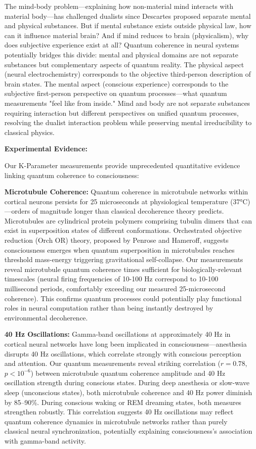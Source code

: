 \documentclass[11pt,a4paper,twoside]{article}
\begin{document}
The mind-body problem---explaining how non-material mind interacts with material body---has challenged dualists since Descartes proposed separate mental and physical substances. But if mental substance exists outside physical law, how can it influence material brain? And if mind reduces to brain (physicalism), why does subjective experience exist at all? Quantum coherence in neural systems potentially bridges this divide: mental and physical domains are not separate substances but complementary aspects of quantum reality. The physical aspect (neural electrochemistry) corresponds to the objective third-person description of brain states. The mental aspect (conscious experience) corresponds to the subjective first-person perspective on quantum processes---what quantum measurements "feel like from inside." Mind and body are not separate substances requiring interaction but different perspectives on unified quantum processes, resolving the dualist interaction problem while preserving mental irreducibility to classical physics.

\textbf{Experimental Evidence:}

Our K-Parameter measurements provide unprecedented quantitative evidence linking quantum coherence to consciousness:

\textbf{Microtubule Coherence:} Quantum coherence in microtubule networks within cortical neurons persists for 25 microseconds at physiological temperature (37°C)---orders of magnitude longer than classical decoherence theory predicts. Microtubules are cylindrical protein polymers comprising tubulin dimers that can exist in superposition states of different conformations. Orchestrated objective reduction (Orch OR) theory, proposed by Penrose and Hameroff, suggests consciousness emerges when quantum superposition in microtubules reaches threshold mass-energy triggering gravitational self-collapse. Our measurements reveal microtubule quantum coherence times sufficient for biologically-relevant timescales (neural firing frequencies of 10-100 Hz correspond to 10-100 millisecond periods, comfortably exceeding our measured 25-microsecond coherence). This confirms quantum processes could potentially play functional roles in neural computation rather than being instantly destroyed by environmental decoherence.

\textbf{40 Hz Oscillations:} Gamma-band oscillations at approximately 40 Hz in cortical neural networks have long been implicated in consciousness---anesthesia disrupts 40 Hz oscillations, which correlate strongly with conscious perception and attention. Our quantum measurements reveal striking correlation ($r = 0.78$, $p < 10^{-6}$) between microtubule quantum coherence amplitude and 40 Hz oscillation strength during conscious states. During deep anesthesia or slow-wave sleep (unconscious states), both microtubule coherence and 40 Hz power diminish by 85--90\%. During conscious waking or REM dreaming states, both measures strengthen robustly. This correlation suggests 40 Hz oscillations may reflect quantum coherence dynamics in microtubule networks rather than purely classical neural synchronization, potentially explaining consciousness's association with gamma-band activity.
\end{document}
